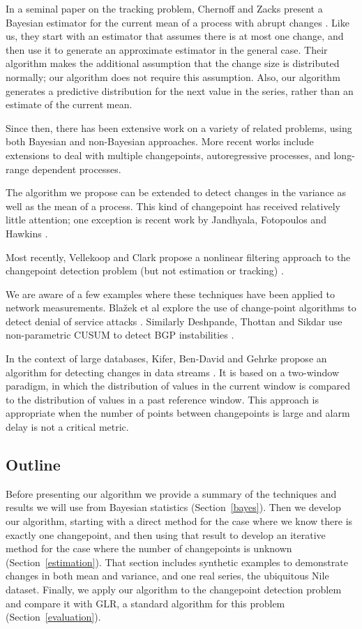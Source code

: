 \documentclass[twocolumn,11pt]{article}
\begin{document}
In a seminal paper on the tracking problem, Chernoff and Zacks present
a Bayesian estimator for the current mean of a process with abrupt changes
\cite{chernoff64estimating}.
Like us, they start with an estimator that assumes there is at most
one change, and then use it to generate an approximate estimator in
the general case.  Their algorithm makes the additional assumption
that the change size is distributed normally; our algorithm does not
require this assumption.  Also, our algorithm generates a predictive
distribution for the next value in the series, rather than an estimate
of the current mean.

Since then, there has been extensive work on a variety of related
problems, using both Bayesian and non-Bayesian approaches.  More
recent works include extensions to deal with multiple changepoints,
autoregressive processes, and long-range dependent processes.

The algorithm we propose can be extended to detect changes in the
variance as well as the mean of a process.  This kind of changepoint
has received relatively little attention; one exception is recent
work by Jandhyala, Fotopoulos and Hawkins \cite{jandhyala02detection}.

Most recently, Vellekoop and Clark propose a nonlinear filtering
approach to the changepoint detection problem (but not estimation
or tracking) \cite{vellekoop06nonlinear}.

We are aware of a few examples where these techniques have been
applied to network measurements.  Bla\v{z}ek et al explore the use of
change-point algorithms to detect denial of service attacks
\cite{blazek01novel}.  Similarly Deshpande, Thottan and Sikdar use
non-parametric CUSUM to detect BGP instabilities
\cite{deshpande04early}.

In the context of large databases, Kifer, Ben-David and Gehrke propose
an algorithm for detecting changes in data streams
\cite{kifer04detecting}.  It is based on a two-window paradigm, in
which the distribution of values in the current window is compared to
the distribution of values in a past reference window.  This approach
is appropriate when the number of points between changepoints is
large and alarm delay is not a critical metric.


\subsection{Outline}

Before presenting our algorithm we provide a summary of the techniques
and results we will use from Bayesian statistics
(Section~\ref{bayes}).  Then we develop our algorithm, starting with a
direct method for the case where we know there is exactly one
changepoint, and then using that result to develop an iterative method
for the case where the number of changepoints is unknown
(Section~\ref{estimation}).  That section includes synthetic examples
to demonstrate changes in both mean and variance, and one real series,
the ubiquitous Nile dataset.  Finally, we apply our algorithm to the
changepoint detection problem and compare it with GLR, a standard
algorithm for this problem (Section~\ref{evaluation}).
\end{document}

